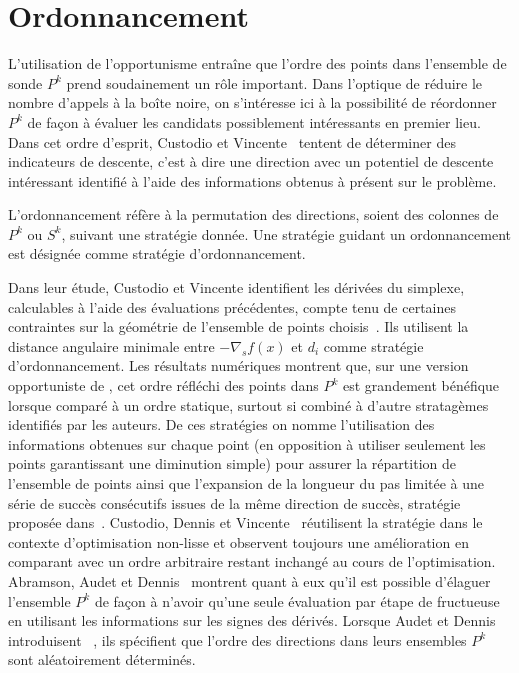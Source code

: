 \section{Ordonnancement}
L'utilisation de l'opportunisme entraîne que l'ordre des points dans l'ensemble de sonde $P^k$ prend soudainement un rôle important. Dans l'optique de réduire le nombre d'appels à la boîte noire, on s'intéresse ici à la possibilité de réordonner $P^k$ de façon à évaluer les candidats possiblement intéressants en premier lieu. Dans cet ordre d'esprit, Custodio et Vincente~\cite{CuVi07} tentent de déterminer des indicateurs de descente, c'est à dire une direction avec un potentiel de descente intéressant identifié à l'aide des informations obtenus à présent sur le problème. 
\begin{definition}[Ordonnancement]
	\label{def_ordo}L'ordonnancement réfère à la permutation des directions, soient des colonnes de $P^k$ ou $S^k$, suivant une stratégie donnée. Une stratégie guidant un ordonnancement est désignée comme stratégie d'ordonnancement.
\end{definition}
 Dans leur étude, Custodio et Vincente identifient les dérivées du simplexe, calculables à l'aide des évaluations précédentes, compte tenu de certaines contraintes sur la géométrie de l'ensemble de points choisis~\cite{CoScVi2006}. Ils utilisent la distance angulaire minimale entre $-\nabla_{s}f(x)$ et $d_i$ comme stratégie d'ordonnancement. Les résultats numériques montrent que, sur une version opportuniste de \CS, cet ordre réfléchi des points dans $P^k$ est grandement bénéfique lorsque comparé à un ordre statique, surtout si combiné à d'autre stratagèmes identifiés par les auteurs. De ces stratégies on nomme l'utilisation des informations obtenues sur chaque point (en opposition à utiliser seulement les points garantissant une diminution simple) pour assurer la répartition de l'ensemble de points ainsi que l'expansion de la longueur du pas limitée à une série de succès consécutifs issues de la même direction de succès, stratégie proposée dans~\cite{HoKoTo01a}. Custodio, Dennis et Vincente~\cite{CuDeVi08} réutilisent la stratégie dans le contexte d'optimisation non-lisse et observent toujours une amélioration en comparant avec un ordre arbitraire restant inchangé au cours de l'optimisation. Abramson, Audet et Dennis~\cite{AbAuDe04a} montrent quant à eux qu'il est possible d'élaguer l'ensemble $P^k$ de façon à n'avoir qu'une seule évaluation par étape de \POLL fructueuse en utilisant les informations sur les signes des dérivés. Lorsque Audet et Dennis introduisent \MADS~\cite{AuDe2006}, ils spécifient que l'ordre des directions dans leurs ensembles $P^k$ sont aléatoirement déterminés.  
   
